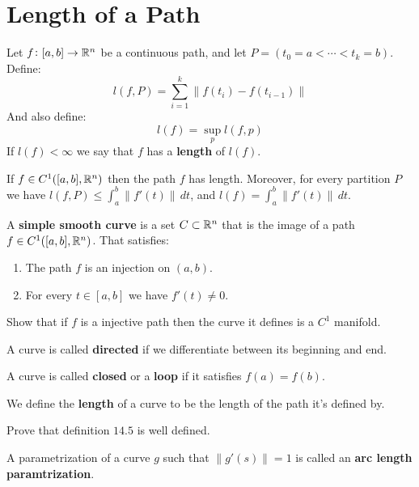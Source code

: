 \documentclass[11pt,a4paper]{article}
\begin{document}
	\newpage
	
	\section{Length of a Path}
	\begin{definition}
		Let $f \colon [a,b] \to \mathbb{R}^n$ be a continuous path, and let
		$P = (t_0 = a < \cdots < t_k = b)$. Define:
		\[
			l(f,P) = \sum_{i=1}^{k}{\|f(t_i) - f(t_{i-1})\|}
		\]
		And also define:
		\[
			l(f) = \sup_{p}{l(f,p)}
		\]
		If $l(f) < \infty$ we say that $f$ has a \textbf{length} of
		$l(f)$.
	\end{definition}
	\begin{proposition}
		If $f \in C^1([a,b], \mathbb{R}^n)$ then the path $f$ has length.
		Moreover, for every partition $P$ we have 
		$l(f,P) \le \int_{a}^{b}{\|f'(t)\|\,dt}$, and 
		$l(f) = \int_{a}^{b}{\|f'(t)\|\,dt}$.
	\end{proposition}
	
	
  \begin{definition}
		A \textbf{simple smooth curve} is a set $C \subset \mathbb{R}^n$ that
		is the image of a path $f \in C^1([a,b],\mathbb{R}^n)$. That satisfies:
		\begin{enumerate}
			\item The path $f$ is an injection on $(a,b)$.
			\item For every $t \in [a,b]$ we have $f'(t) \neq 0$.
		\end{enumerate}
	\end{definition}
	Show that if $f$ is a injective path then the curve it defines is
	a $C^1$ manifold.
	\begin{definition}
		A curve is called \textbf{directed} if we differentiate between
		its beginning and end.
	\end{definition}
	\begin{definition}
		A curve is called \textbf{closed} or a \textbf{loop} if it
		satisfies $f(a) = f(b)$.
	\end{definition}
	\begin{definition}
		We define the \textbf{length} of a curve to be the length
		of the path it's defined by.
	\end{definition}
	Prove that definition $14.5$ is well defined.
	\begin{definition}
		A parametrization of a curve $g$ such that $\|g'(s)\| = 1$
		is called an \textbf{arc length paramtrization}.
	\end{definition}
	
\end{document}
